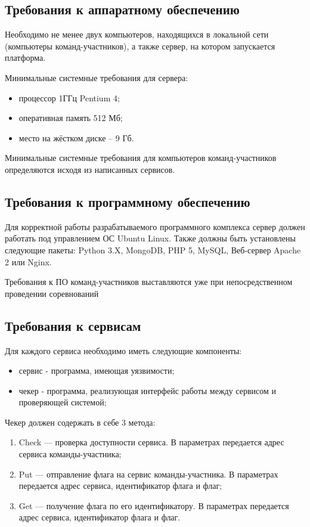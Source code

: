 \subsection {Требования к аппаратному обеспечению}

Необходимо не менее двух компьютеров, находящихся в локальной сети (компьютеры команд-участников), а также сервер, на котором запускается платформа.

Минимальные системные требования для сервера:

\begin{itemize}
\item процессор 1ГГц Pentium 4;
\item оперативная память 512 Мб;
\item место на жёстком диске -- 9 Гб.
\end{itemize}

Минимальные системные требования для компьютеров команд-участников определяются исходя из написанных сервисов.

\subsection {Требования к программному обеспечению}
Для корректной работы разрабатываемого программного комплекса сервер должен работать под управлением ОС Ubuntu Linux. 
Также должны быть установлены следующие пакеты: Python 3.X, MongoDB, PHP 5, MySQL, Веб-сервер Apache 2 или Nginx.


Требования к ПО команд-участников выставляются уже при непосредственном проведении соревнований

\subsection {Требования к сервисам}
Для каждого сервиса необходимо иметь следующие компоненты:

\begin{itemize}
\item сервис - программа, имеющая уязвимости;
\item чекер - программа, реализующая интерфейс работы между сервисом и проверяющей системой;
\end{itemize}

Чекер должен содержать в себе 3 метода:

\begin{enumerate}
\item Check --- проверка доступности сервиса. В параметрах передается адрес сервиса команды-участника;
\item Put --- отправление флага на сервис команды-участника. В параметрах передается адрес сервиса, идентификатор флага и флаг;
\item Get --- получение флага по его идентификатору. В параметрах передается адрес сервиса, идентификатор флага и флаг.
\end{enumerate}

